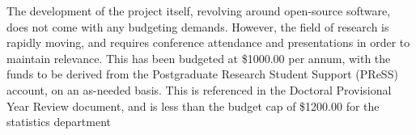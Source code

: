 The development of the project itself, revolving around open-source software, does not come with any budgeting demands.
However, the field of research is rapidly moving, and requires conference attendance and presentations in order to maintain relevance.
This has been budgeted at \$1000.00 per annum, with the funds to be derived from the Postgraduate Research Student Support (PReSS) account, on an as-needed basis.
This is referenced in the Doctoral Provisional Year Review document, and is less than the budget cap of \$1200.00 for the statistics department

